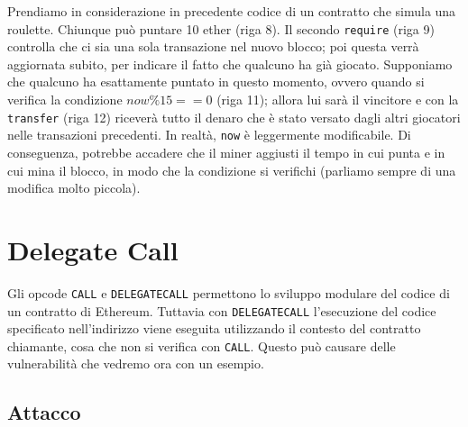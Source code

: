 Prendiamo in considerazione in precedente codice di un contratto che simula
una roulette.
Chiunque può puntare 10 ether (riga 8).
Il secondo \verb|require| (riga 9) controlla che ci sia una
sola transazione nel nuovo blocco;
poi questa verrà aggiornata subito,
per indicare il fatto che qualcuno ha già giocato.
Supponiamo che qualcuno ha
esattamente puntato in questo
momento, ovvero quando si
verifica la condizione $now \%15 ==  0$ (riga 11); allora lui sarà
il vincitore e con la \verb|transfer| (riga 12)
riceverà tutto il denaro che è stato versato dagli altri giocatori nelle
transazioni precedenti.
In realtà, \verb|now| è leggermente modificabile.
Di conseguenza, potrebbe accadere che il
miner aggiusti il tempo in cui punta e in cui mina il blocco,
in modo che la condizione si
verifichi (parliamo sempre di una modifica molto piccola).

\section{Delegate Call}

Gli opcode \verb|CALL| e \verb|DELEGATECALL| permettono lo sviluppo modulare
del codice di un contratto di Ethereum.
Tuttavia con \verb|DELEGATECALL| l'esecuzione del codice specificato
nell'indirizzo viene eseguita utilizzando il contesto del contratto chiamante,
cosa che non si verifica con \verb|CALL|.
Questo può causare delle vulnerabilità che vedremo ora con un esempio.

\subsection{Attacco}

